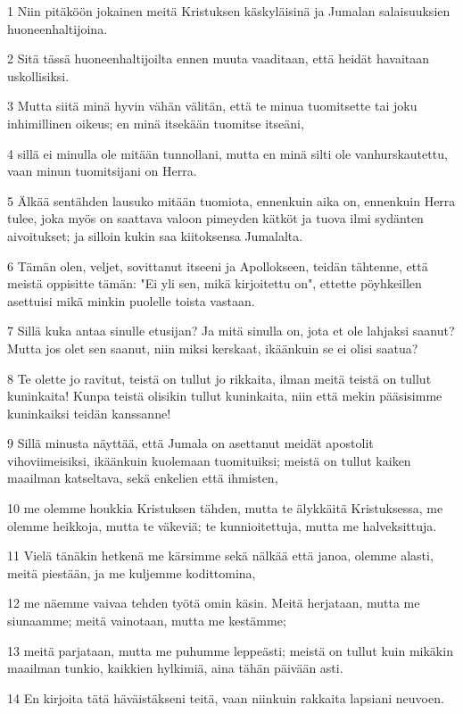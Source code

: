 \par 1 Niin pitäköön jokainen meitä Kristuksen käskyläisinä ja Jumalan salaisuuksien huoneenhaltijoina.
\par 2 Sitä tässä huoneenhaltijoilta ennen muuta vaaditaan, että heidät havaitaan uskollisiksi.
\par 3 Mutta siitä minä hyvin vähän välitän, että te minua tuomitsette tai joku inhimillinen oikeus; en minä itsekään tuomitse itseäni,
\par 4 sillä ei minulla ole mitään tunnollani, mutta en minä silti ole vanhurskautettu, vaan minun tuomitsijani on Herra.
\par 5 Älkää sentähden lausuko mitään tuomiota, ennenkuin aika on, ennenkuin Herra tulee, joka myös on saattava valoon pimeyden kätköt ja tuova ilmi sydänten aivoitukset; ja silloin kukin saa kiitoksensa Jumalalta.
\par 6 Tämän olen, veljet, sovittanut itseeni ja Apollokseen, teidän tähtenne, että meistä oppisitte tämän: "Ei yli sen, mikä kirjoitettu on", ettette pöyhkeillen asettuisi mikä minkin puolelle toista vastaan.
\par 7 Sillä kuka antaa sinulle etusijan? Ja mitä sinulla on, jota et ole lahjaksi saanut? Mutta jos olet sen saanut, niin miksi kerskaat, ikäänkuin se ei olisi saatua?
\par 8 Te olette jo ravitut, teistä on tullut jo rikkaita, ilman meitä teistä on tullut kuninkaita! Kunpa teistä olisikin tullut kuninkaita, niin että mekin pääsisimme kuninkaiksi teidän kanssanne!
\par 9 Sillä minusta näyttää, että Jumala on asettanut meidät apostolit vihoviimeisiksi, ikäänkuin kuolemaan tuomituiksi; meistä on tullut kaiken maailman katseltava, sekä enkelien että ihmisten,
\par 10 me olemme houkkia Kristuksen tähden, mutta te älykkäitä Kristuksessa, me olemme heikkoja, mutta te väkeviä; te kunnioitettuja, mutta me halveksittuja.
\par 11 Vielä tänäkin hetkenä me kärsimme sekä nälkää että janoa, olemme alasti, meitä piestään, ja me kuljemme kodittomina,
\par 12 me näemme vaivaa tehden työtä omin käsin. Meitä herjataan, mutta me siunaamme; meitä vainotaan, mutta me kestämme;
\par 13 meitä parjataan, mutta me puhumme leppeästi; meistä on tullut kuin mikäkin maailman tunkio, kaikkien hylkimiä, aina tähän päivään asti.
\par 14 En kirjoita tätä häväistäkseni teitä, vaan niinkuin rakkaita lapsiani neuvoen.
